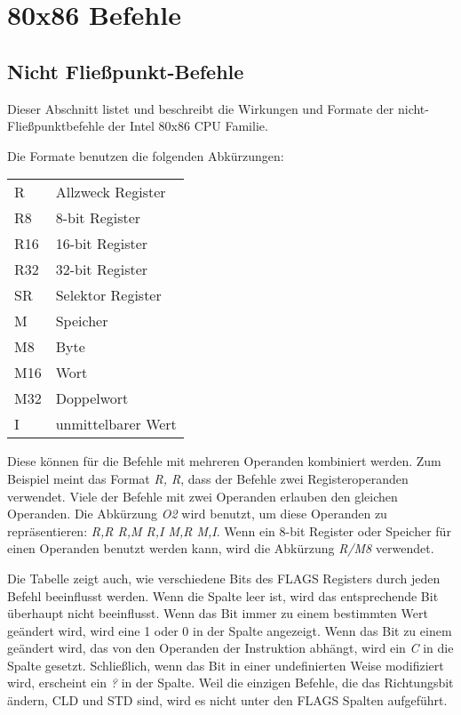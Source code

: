 \chapter{80x86 Befehle}
\section{Nicht Flie{\ss}punkt-Befehle}
Dieser Abschnitt listet und beschreibt die Wirkungen und Formate der
nicht-Flie{\ss}punktbefehle der Intel 80x86 CPU Familie. 

Die Formate benutzen die folgenden Abk\"{u}rzungen:
\begin{center}
\begin{tabular}{|l|l|}
\hline
R   & Allzweck Register \\
R8  & 8-bit Register \\
R16 & 16-bit Register \\
R32 & 32-bit Register \\
SR  & Selektor Register \\
M   & Speicher \\
M8  & Byte \\
M16 & Wort \\
M32 & Doppelwort \\
I   & unmittelbarer Wert \\
\hline
\end{tabular}
\end{center}
Diese k\"{o}nnen f\"{u}r die Befehle mit mehreren Operanden kombiniert
werden. Zum Beispiel meint das Format \emph{R, R}, dass der Befehle
zwei Registeroperanden verwendet. Viele der Befehle mit zwei
Operanden erlauben den gleichen Operanden. Die Abk\"{u}rzung \emph{O2}
wird benutzt, um diese Operanden zu repr\"{a}sentieren: \emph{R,R R,M
R,I M,R M,I}. Wenn ein 8-bit Register oder Speicher f\"{u}r einen
Operanden benutzt werden kann, wird die Abk\"{u}rzung \emph{R/M8}
verwendet.

Die Tabelle zeigt auch, wie verschiedene Bits des FLAGS Registers
durch jeden Befehl beeinflusst werden. Wenn die Spalte leer ist,
wird das entsprechende Bit \"{u}berhaupt nicht beeinflusst. Wenn das Bit
immer zu einem bestimmten Wert ge\"{a}ndert wird, wird eine 1 oder 0 in
der Spalte angezeigt. Wenn das Bit zu einem ge\"{a}ndert wird, das von
den Operanden der Instruktion abh\"{a}ngt, wird ein \emph{C} in die
Spalte gesetzt. Schlie{\ss}lich, wenn das Bit in einer undefinierten
Weise modifiziert wird, erscheint ein \emph{?} in der Spalte. Weil
die einzigen Befehle, die das Richtungsbit \"{a}ndern, {\code CLD} und
{\code STD} sind, wird es nicht unter den FLAGS Spalten aufgef\"{u}hrt.
\pagebreak


